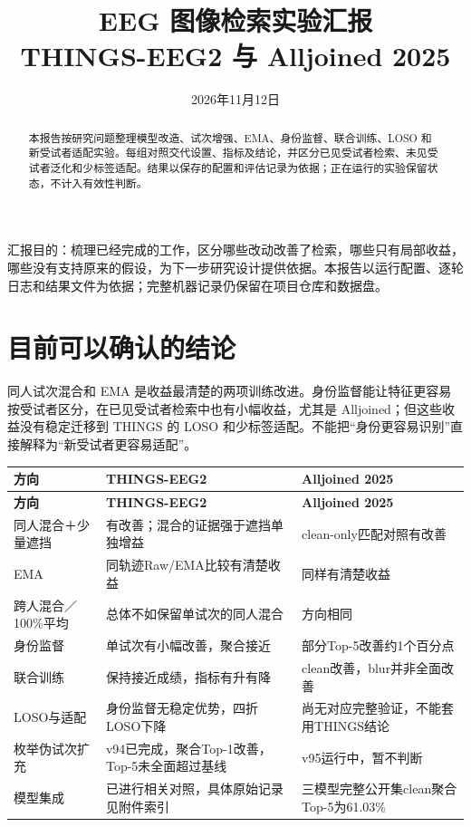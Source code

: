 \documentclass[UTF8,a4paper,11pt,fontset=none]{ctexart}
\title{EEG 图像检索实验汇报\\\large THINGS-EEG2 与 Alljoined 2025}
\author{}\date{2026年11月12日}
\begin{document}
\maketitle
\begin{abstract}
本报告按研究问题整理模型改造、试次增强、EMA、身份监督、联合训练、LOSO 和新受试者适配实验。每组对照交代设置、指标及结论，并区分已见受试者检索、未见受试者泛化和少标签适配。结果以保存的配置和评估记录为依据；正在运行的实验保留状态，不计入有效性判断。
\end{abstract}
\tableofcontents
\clearpage
汇报目的：梳理已经完成的工作，区分哪些改动改善了检索，哪些只有局部收益，哪些没有支持原来的假设，为下一步研究设计提供依据。本报告以运行配置、逐轮日志和结果文件为依据；完整机器记录仍保留在项目仓库和数据盘。

\section{目前可以确认的结论}
同人试次混合和 EMA 是收益最清楚的两项训练改进。身份监督能让特征更容易按受试者区分，在已见受试者检索中也有小幅收益，尤其是 Alljoined；但这些收益没有稳定迁移到 THINGS 的 LOSO 和少标签适配。不能把“身份更容易识别”直接解释为“新受试者更容易适配”。

{\small
\begin{longtable}{>{\raggedright\arraybackslash}p{3.311cm}>{\raggedright\arraybackslash}p{6.623cm}>{\raggedright\arraybackslash}p{6.623cm}}
\toprule
\textbf{方向} & \textbf{THINGS-EEG2} & \textbf{Alljoined 2025} \\
\midrule\endfirsthead
\textbf{方向} & \textbf{THINGS-EEG2} & \textbf{Alljoined 2025} \\
\midrule\endhead
\bottomrule\endfoot
同人混合＋少量遮挡 & 有改善；混合的证据强于遮挡单独增益 & clean-only匹配对照有改善 \\
EMA & 同轨迹Raw/EMA比较有清楚收益 & 同样有清楚收益 \\
跨人混合／100\%平均 & 总体不如保留单试次的同人混合 & 方向相同 \\
身份监督 & 单试次有小幅改善，聚合接近 & 部分Top-5改善约1个百分点 \\
联合训练 & 保持接近成绩，指标有升有降 & clean改善，blur并非全面改善 \\
LOSO与适配 & 身份监督无稳定优势，四折LOSO下降 & 尚无对应完整验证，不能套用THINGS结论 \\
枚举伪试次扩充 & v94已完成，聚合Top-1改善，Top-5未全面超过基线 & v95运行中，暂不判断 \\
模型集成 & 已进行相关对照，具体原始记录见附件索引 & 三模型完整公开集clean聚合Top-5为61.03\% \\
\end{longtable}
}
\end{document}
